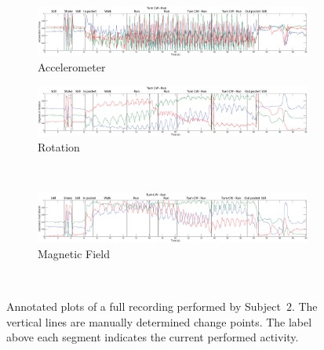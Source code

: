 \begin{figure}
  \centering
  \begin{subfigure}[b]{1\textwidth}
    \includegraphics[width=\textwidth]{./Figures/chapter6/data_collection/run-5-run-fountain-jos/data_plot_acc_annotated.eps}
    \caption{Accelerometer}
    \label{fig:recording_subject_2_run_5_accelerometer}
  \end{subfigure}

  \begin{subfigure}[b]{1\textwidth}
    \includegraphics[width=\textwidth]{./Figures/chapter6/data_collection/run-5-run-fountain-jos/data_plot_rot_annotated.eps}
    \caption{Rotation}
    \label{fig:recording_subject_2_run_5_rotation}
  \end{subfigure} \\

  \begin{subfigure}[b]{1\textwidth}
    \includegraphics[width=\textwidth]{./Figures/chapter6/data_collection/run-5-run-fountain-jos/data_plot_mag_annotated.eps}
    \caption{Magnetic Field}
    \label{fig:recording_subject_2_run_5_magnetic}
  \end{subfigure} \\
  \caption[Plots run 5]{Annotated plots of a full recording performed by Subject~$2$. The vertical lines are manually determined change points. The label above each segment indicates the current performed activity.}\label{fig:plots_subject_2}
\end{figure}

